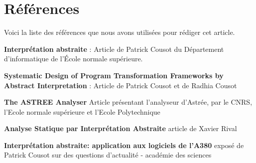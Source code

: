 \documentclass[french]{article}
\begin{document}
\section{Références}
Voici la liste des références que nous avons utilisées pour rédiger cet article.
\begin{description}
    \item \textbf{Interprétation abstraite} : Article de Patrick Cousot du
    Département d’informatique de l'École normale supérieure.
    \item \textbf{Systematic Design of Program Transformation Frameworks by Abstract Interpretation} :
    Article de Patrick Cousot et de Radhia Cousot
    \item \textbf{The ASTREE Analyser} Article présentant l'analyseur d'Astrée, par le CNRS, l'Ecole normale supérieure
    et l'Ecole Polytechnique
    \item \textbf{Analyse Statique par Interprétation
Abstraite} article de Xavier Rival
  \item \textbf{Interprétation abstraite: application aux logiciels de l'A380} exposé de Patrick Cousot sur des questions d'actualité - académie des sciences
\end{description}
\end{document}
